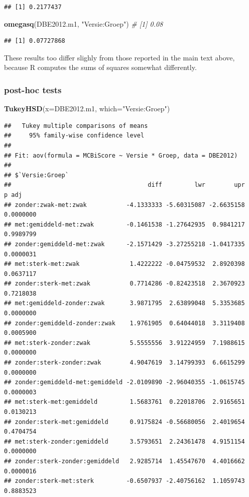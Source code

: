 \documentclass[
]{book}
\newenvironment{Shaded}{\begin{snugshade}}{\end{snugshade}}
\newcommand{\AttributeTok}[1]{\textcolor[rgb]{0.13,0.29,0.53}{#1}}
\newcommand{\CommentTok}[1]{\textcolor[rgb]{0.56,0.35,0.01}{\textit{#1}}}
\newcommand{\FunctionTok}[1]{\textcolor[rgb]{0.13,0.29,0.53}{\textbf{#1}}}
\newcommand{\NormalTok}[1]{#1}
\newcommand{\StringTok}[1]{\textcolor[rgb]{0.31,0.60,0.02}{#1}}
\begin{document}
\begin{verbatim}
## [1] 0.2177437
\end{verbatim}

\begin{Shaded}
\begin{Highlighting}[]
\FunctionTok{omegasq}\NormalTok{(DBE2012.m1, }\StringTok{"Versie:Groep"}\NormalTok{)  }\CommentTok{\# [1] 0.08}
\end{Highlighting}
\end{Shaded}

\begin{verbatim}
## [1] 0.07727868
\end{verbatim}

These results too differ slighly from those reported in the main text above, because R computes the sums of squares somewhat differently.

\subsubsection{post-hoc tests}\label{post-hoc-tests}

\begin{Shaded}
\begin{Highlighting}[]
\FunctionTok{TukeyHSD}\NormalTok{(}\AttributeTok{x=}\NormalTok{DBE2012.m1, }\AttributeTok{which=}\StringTok{"Versie:Groep"}\NormalTok{)}
\end{Highlighting}
\end{Shaded}

\begin{verbatim}
##   Tukey multiple comparisons of means
##     95% family-wise confidence level
## 
## Fit: aov(formula = MCBiScore ~ Versie * Groep, data = DBE2012)
## 
## $`Versie:Groep`
##                                      diff         lwr        upr     p adj
## zonder:zwak-met:zwak           -4.1333333 -5.60315087 -2.6635158 0.0000000
## met:gemiddeld-met:zwak         -0.1461538 -1.27642935  0.9841217 0.9989799
## zonder:gemiddeld-met:zwak      -2.1571429 -3.27255218 -1.0417335 0.0000031
## met:sterk-met:zwak              1.4222222 -0.04759532  2.8920398 0.0637117
## zonder:sterk-met:zwak           0.7714286 -0.82423518  2.3670923 0.7218038
## met:gemiddeld-zonder:zwak       3.9871795  2.63899048  5.3353685 0.0000000
## zonder:gemiddeld-zonder:zwak    1.9761905  0.64044018  3.3119408 0.0005900
## met:sterk-zonder:zwak           5.5555556  3.91224959  7.1988615 0.0000000
## zonder:sterk-zonder:zwak        4.9047619  3.14799393  6.6615299 0.0000000
## zonder:gemiddeld-met:gemiddeld -2.0109890 -2.96040355 -1.0615745 0.0000003
## met:sterk-met:gemiddeld         1.5683761  0.22018706  2.9165651 0.0130213
## zonder:sterk-met:gemiddeld      0.9175824 -0.56680056  2.4019654 0.4704754
## met:sterk-zonder:gemiddeld      3.5793651  2.24361478  4.9151154 0.0000000
## zonder:sterk-zonder:gemiddeld   2.9285714  1.45547670  4.4016662 0.0000016
## zonder:sterk-met:sterk         -0.6507937 -2.40756162  1.1059743 0.8883523
\end{verbatim}
\end{document}
